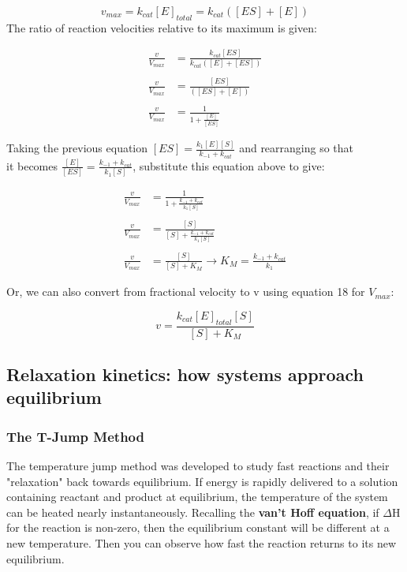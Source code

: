 \documentclass[12pt, letterpaper]{article}
\begin{document}
    \begin{equation}
        v_{max} = k_{cat}[E]_{total} = k_{cat}([ES] + [E])
    \end{equation}
    The ratio of reaction velocities relative to its maximum is given: 

    \begin{align*}
        \frac{v}{V_{max}} &= \frac{k_{cat}[ES]}{k_{cat}([E] + [ES])} \\ \\
        \frac{v}{V_{max}} &= \frac{[ES]}{([ES] + [E])} \\ \\
        \frac{v}{V_{max}} &= \frac{1}{1 + \frac{[E]}{[ES]}}
    \end{align*}

    Taking the previous equation \( [ES] = \frac{k_1[E][S]}{k_{-1} +  k_{cat}} \) and rearranging so that \\ it becomes \( \frac{[E]}{[ES]} = \frac{k_{-1} + k_{cat}}{k_1[S]}\), substitute this equation above to give:

    \begin{align*}
        \frac{v}{V_{max}} &= \frac{1}{1 + \frac{k_{-1} + k_{cat}}{k_1[S]}} \\ \\
        \frac{v}{V_{max}} &= \frac{[S]}{[S] + \frac{k_{-1} + k_{cat}}{k_1[S]}} \\ \\
        \frac{v}{V_{max}} &= \frac{[S]}{[S] + K_M} \longrightarrow K_M = \frac{k_{-1} + k_{cat}}{k_1}
    \end{align*}
    
    Or, we can also convert from fractional velocity to v using equation 18 for $V_{max}$:

    \begin{equation}
        v = \frac{k_{cat}[E]_{total}[S]}{[S] + K_M}
    \end{equation}

    \newpage

    \subsection*{Relaxation kinetics: how systems approach equilibrium}
    \subsubsection*{The T-Jump Method}
    The temperature jump method was developed to study fast reactions and their "relaxation" back towards equilibrium. 
    If energy is rapidly delivered to a solution containing reactant and product at equilibrium, the temperature of the 
    system can be heated nearly instantaneously. Recalling the \textbf{van't Hoff equation}, if $\Delta$H for the reaction is non-zero,
    then the equilibrium constant will be different at a new temperature. Then you can observe how fast the reaction returns to its 
    new equilibrium. 
\end{document}
